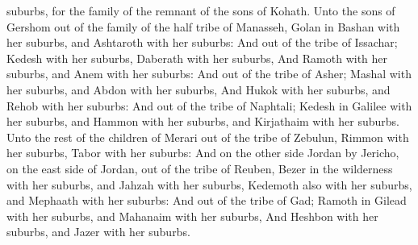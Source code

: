 {suburbs, for the
family of the
remnant of the
sons of
Kohath.
Unto the
sons of
Gershom
{} out of the
family of the
half
tribe of
Manasseh,
Golan in
Bashan with her
suburbs, and
Ashtaroth with her
suburbs:
And out of the
tribe of
Issachar;
Kedesh with her
suburbs,
Daberath with her
suburbs,
And
Ramoth with her
suburbs, and
Anem with her
suburbs:
And out of the
tribe of
Asher;
Mashal with her
suburbs, and
Abdon with her
suburbs,
And
Hukok with her
suburbs, and
Rehob with her
suburbs:
And out of the
tribe of
Naphtali;
Kedesh in
Galilee with her
suburbs, and
Hammon with her
suburbs, and
Kirjathaim with her
suburbs.
Unto the
rest of the
children of
Merari
{} out of the
tribe of
Zebulun,
Rimmon with her
suburbs,
Tabor with her
suburbs:
And on the other
side
Jordan by
Jericho, on the east
side of
Jordan,
{} out of the
tribe of
Reuben,
Bezer in the
wilderness with her
suburbs, and
Jahzah with her
suburbs,
Kedemoth also with her
suburbs, and
Mephaath with her
suburbs:
And out of the
tribe of
Gad;
Ramoth in
Gilead with her
suburbs, and
Mahanaim with her
suburbs,
And
Heshbon with her
suburbs, and
Jazer with her
suburbs.

}
